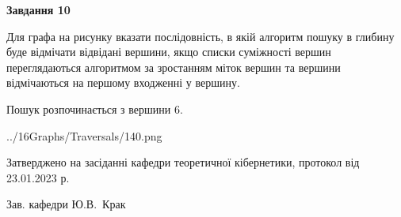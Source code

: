 \documentclass[12pt, ukrainian]{article}
\begin{document}
{\begin {large}
{\begin {center}\textbf{Завдання 10}\end {center}}\par
Для графа на рисунку вказати послідовність, в якій алгоритм пошуку в глибину буде відмічати відвідані вершини, якщо списки суміжності вершин переглядаються алгоритмом за зростанням міток вершин та вершини відмічаються на першому вход\-женні у вершину.\par
Пошук розпочинається з вершини 6.\par

\begin{center}
	{../16Graphs/Traversals/140.png}
\end{center}\par
\newpage


\end {large}
}
{\smallskip \begin {small} Затверджено на засіданні кафедри теоретичної кібернетики, протокол  від   23.01.2023 р.\par\smallskip\smallskip
{\parbox {6.5 cm}{Зав. кафедри \dotfill Ю.В.~Крак}} \end{small}}
\end{document}
